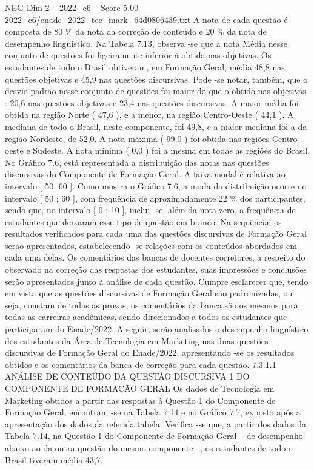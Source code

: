 \begin{textsample}{NEG Dim 2 – 2022\_c6 – Score 5.00 – 2022\_c6/enade\_2022\_tec\_mark\_64d0806439.txt}
A nota de cada questão é composta de 80 \% da nota da correção de conteúdo e 20 \% da nota de desempenho linguístico.
Na Tabela 7.13, observa -se que a nota Média nesse conjunto de questões foi ligeiramente inferior à obtida nas objetivas.
Os estudantes de todo o Brasil obtiveram, em Formação Geral, média 48,8 nas questões objetivas e 45,9 nas questões discursivas.
Pode -se notar, também, que o desvio-padrão nesse conjunto de questões foi maior do que o obtido nas objetivas : 20,6 nas questões objetivas e 23,4 nas questões discursivas.
A maior média foi obtida na região Norte ( 47,6 ), e a menor, na região Centro-Oeste ( 44,1 ).
A mediana de todo o Brasil, neste componente, foi 49,8, e a maior mediana foi a da região Nordeste, de 52,0.
A nota máxima ( 99,0 ) foi obtida nas regiões Centro-oeste e Sudeste.
A nota mínima ( 0,0 ) foi a mesma em todas as regiões do Brasil.
No Gráfico 7.6, está representada a distribuição das notas nas questões discursivas do Componente de Formação Geral.
A faixa modal é relativa ao intervalo [ 50, 60 ].
Como mostra o Gráfico 7.6, a moda da distribuição ocorre no intervalo [ 50 ; 60 ], com frequência de aproximadamente 22 \% dos participantes, sendo que, no intervalo [ 0 ; 10 ], inclui -se, além da nota zero, a frequência de estudantes que deixaram esse tipo de questão em branco.
Na sequência, os resultados verificados para cada uma das questões discursivas de Formação Geral serão apresentados, estabelecendo -se relações com os conteúdos abordados em cada uma delas.
Os comentários das bancas de docentes corretores, a respeito do observado na correção das respostas dos estudantes, suas impressões e conclusões serão apresentados junto à análise de cada questão.
Cumpre esclarecer que, tendo em vista que as questões discursivas de Formação Geral são padronizadas, ou seja, constam de todas as provas, os comentários da banca são os mesmos para todas as carreiras acadêmicas, sendo direcionados a todos os estudantes que participaram do Enade/2022.
A seguir, serão analisados o desempenho linguístico dos estudantes da Área de Tecnologia em Marketing nas duas questões discursivas de Formação Geral do Enade/2022, apresentando -se os resultados obtidos e os comentários da banca de correção para cada questão. 7.3.1.1 ANÁLISE DE CONTEÚDO DA QUESTÃO DISCURSIVA 1 DO COMPONENTE DE FORMAÇÃO GERAL Os dados de Tecnologia em Marketing obtidos a partir das respostas à Questão 1 do Componente de Formação Geral, encontram -se na Tabela 7.14 e no Gráfico 7.7, exposto após a apresentação dos dados da referida tabela.
Verifica -se que, a partir dos dados da Tabela 7.14, na Questão 1 do Componente de Formação Geral – de desempenho abaixo ao da outra questão do mesmo componente –, os estudantes de todo o Brasil tiveram média 43,7.

\end{textsample}

